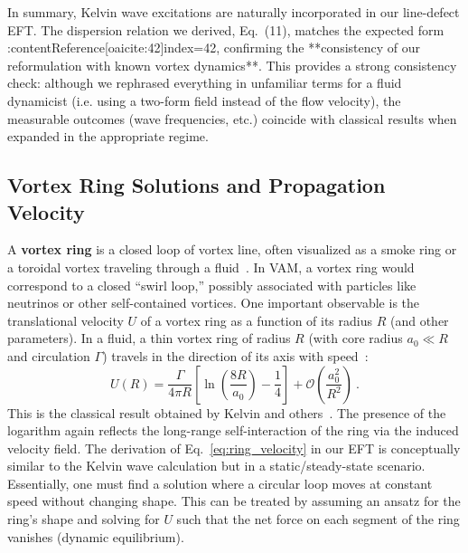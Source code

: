 \documentclass[12pt]{article}
\begin{document}
In summary, Kelvin wave excitations are naturally incorporated in our line-defect EFT. The dispersion relation we derived, Eq. (11), matches the expected form :contentReference[oaicite:42]{index=42}, confirming the **consistency of our reformulation with known vortex dynamics**. This provides a strong consistency check: although we rephrased everything in unfamiliar terms for a fluid dynamicist (i.e. using a two-form field instead of the flow velocity), the measurable outcomes (wave frequencies, etc.) coincide with classical results when expanded in the appropriate regime. 

\subsection{Vortex Ring Solutions and Propagation Velocity}

A \textbf{vortex ring} is a closed loop of vortex line, often visualized as a smoke ring or a toroidal vortex traveling through a fluid~\cite{ref:kelvin,ref:lamb}. In VAM, a vortex ring would correspond to a closed ``swirl loop,'' possibly associated with particles like neutrinos or other self-contained vortices. One important observable is the translational velocity $U$ of a vortex ring as a function of its radius $R$ (and other parameters). In a fluid, a thin vortex ring of radius $R$ (with core radius $a_0 \ll R$ and circulation $\Gamma$) travels in the direction of its axis with speed~\cite{ref:saffman}:
\begin{equation}
    U(R) = \frac{\Gamma}{4\pi R}\left[\ln\left(\frac{8R}{a_0}\right) - \frac{1}{4}\right] + \mathcal{O}\left(\frac{a_0^2}{R^2}\right)~.
    \label{eq:ring_velocity}
\end{equation}
This is the classical result obtained by Kelvin and others~\cite{ref:kelvin}. The presence of the logarithm again reflects the long-range self-interaction of the ring via the induced velocity field. The derivation of Eq.~\eqref{eq:ring_velocity} in our EFT is conceptually similar to the Kelvin wave calculation but in a static/steady-state scenario. Essentially, one must find a solution where a circular loop moves at constant speed without changing shape. This can be treated by assuming an ansatz for the ring’s shape and solving for $U$ such that the net force on each segment of the ring vanishes (dynamic equilibrium).
\end{document}
